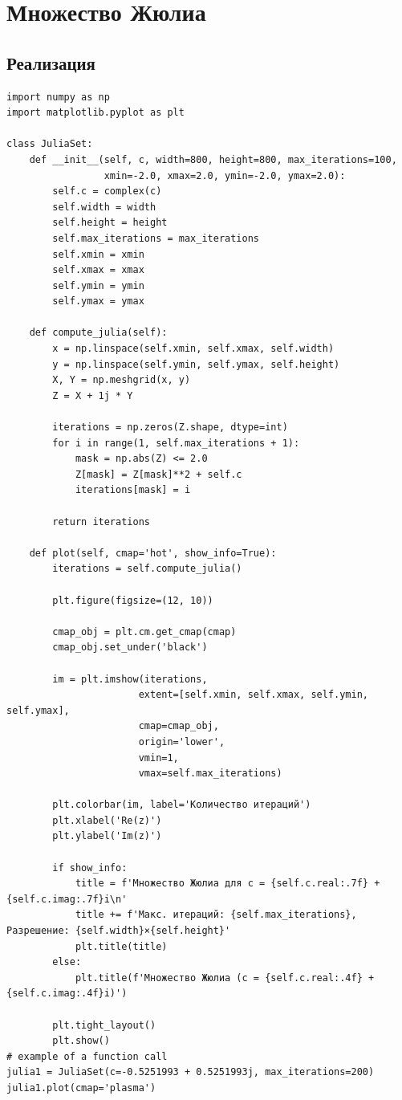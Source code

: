 \section{Множество Жюлиа}

\subsection{Реализация}

\begin{lstlisting}[caption=Построение множества Жюлиа]
import numpy as np
import matplotlib.pyplot as plt

class JuliaSet:
    def __init__(self, c, width=800, height=800, max_iterations=100, 
                 xmin=-2.0, xmax=2.0, ymin=-2.0, ymax=2.0):
        self.c = complex(c)
        self.width = width
        self.height = height
        self.max_iterations = max_iterations
        self.xmin = xmin
        self.xmax = xmax
        self.ymin = ymin
        self.ymax = ymax
        
    def compute_julia(self):
        x = np.linspace(self.xmin, self.xmax, self.width)
        y = np.linspace(self.ymin, self.ymax, self.height)
        X, Y = np.meshgrid(x, y)
        Z = X + 1j * Y
         
        iterations = np.zeros(Z.shape, dtype=int)
        for i in range(1, self.max_iterations + 1):
            mask = np.abs(Z) <= 2.0
            Z[mask] = Z[mask]**2 + self.c
            iterations[mask] = i
        
        return iterations
    
    def plot(self, cmap='hot', show_info=True):
        iterations = self.compute_julia()
        
        plt.figure(figsize=(12, 10))
        
        cmap_obj = plt.cm.get_cmap(cmap)
        cmap_obj.set_under('black')
        
        im = plt.imshow(iterations, 
                       extent=[self.xmin, self.xmax, self.ymin, self.ymax],
                       cmap=cmap_obj, 
                       origin='lower',
                       vmin=1,
                       vmax=self.max_iterations)
        
        plt.colorbar(im, label='Количество итераций')
        plt.xlabel('Re(z)')
        plt.ylabel('Im(z)')
        
        if show_info:
            title = f'Множество Жюлиа для c = {self.c.real:.7f} + {self.c.imag:.7f}i\n'
            title += f'Макс. итераций: {self.max_iterations}, Разрешение: {self.width}×{self.height}'
            plt.title(title)
        else:
            plt.title(f'Множество Жюлиа (c = {self.c.real:.4f} + {self.c.imag:.4f}i)')
        
        plt.tight_layout()
        plt.show()
# example of a function call
julia1 = JuliaSet(c=-0.5251993 + 0.5251993j, max_iterations=200)
julia1.plot(cmap='plasma')
\end{lstlisting}

